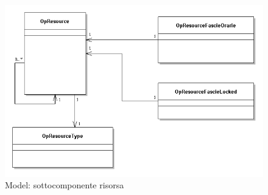 \begin{figure}[H]
\begin{center}
\includegraphics[width=1\textwidth]{img/Resource.png}
\caption{Model: sottocomponente risorsa}
\label{fig:Model: sottocomponente risorsa}
\end{center}
\end{figure}

